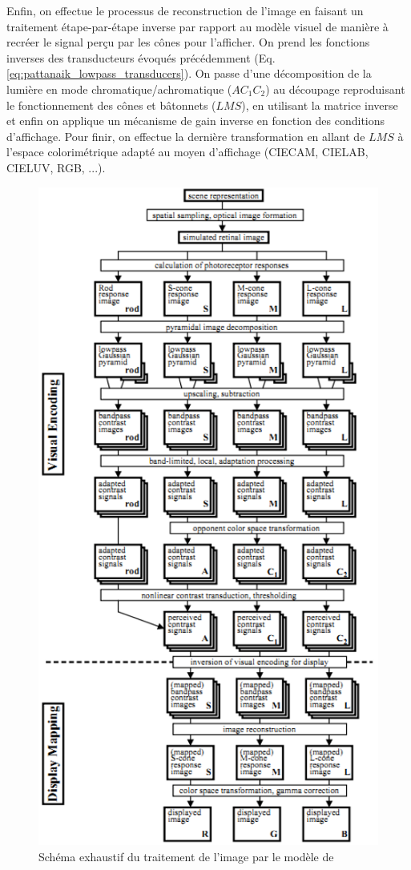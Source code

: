 	\par Enfin, on effectue le processus de reconstruction de l'image en faisant un traitement étape-par-étape inverse par rapport au modèle visuel de manière à recréer le signal perçu par les cônes pour l'afficher. On prend les fonctions inverses des transducteurs évoqués précédemment (Eq. \ref{eq:pattanaik_lowpass_transducers}). On passe d'une décomposition de la lumière en mode chromatique/achromatique ($AC_1C_2$) au découpage reproduisant le fonctionnement des cônes et bâtonnets ($LMS$), en utilisant la matrice inverse et enfin on applique un mécanisme de gain inverse en fonction des conditions d'affichage. Pour finir, on effectue la dernière transformation en allant de $LMS$ à l'espace colorimétrique adapté au moyen d'affichage (CIECAM, CIELAB, CIELUV, RGB, ...).
	
	\begin{figure}
		\centering
		\includegraphics[scale=1.25]{Figures/PattanaikFullModel}
		\caption{Schéma exhaustif du traitement de l'image par le modèle de \cite{pattanaik_multiscale_1998}}
		\label{fig:full_model_pattanaik}
	\end{figure}
	
